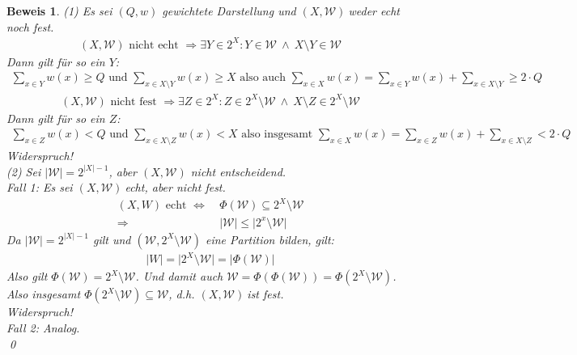 \documentclass[ngerman]{scrartcl}
\theoremstyle{custom}
\newtheorem*{bw}{Beweis}
\newcommand{\0}{\mathbf{0}}
\newcommand{\1}{\mathbf{L}}
\newcommand{\sg}{$(X,\mathcal{W})~$}
\newcommand{\W}{\mathcal{W}}
\begin{document}
\begin{bw}
(1) Es sei $(Q,w)$ gewichtete Darstellung und \sg weder echt noch
fest.
\begin{align*}
(X,\W) \text{ nicht echt } \Rightarrow \exists Y \in 2^X: Y \in \W
~\wedge~ X \setminus Y \in \W
\end{align*}
Dann gilt f\"ur so ein $Y$:
\begin{align*}
\sum_{x \in Y} w(x) \geq Q \text{ und } \sum_{x \in X \setminus Y}
w(x) \geq X \text{ also auch } \sum_{x \in X} w(x) = \sum_{x \in
  Y} w(x) + \sum_{x \in X \setminus Y} \geq 2 \cdot Q
\end{align*}
\begin{align*}
(X,\W) \text{ nicht fest } \Rightarrow \exists Z \in 2^X: Z \in 2^X
\setminus \W ~\wedge~ X \setminus Z \in 2^X \setminus \W
\end{align*}
Dann gilt f\"ur so ein $Z$:
\begin{align*}
\sum_{x \in Z} w(x) < Q \text{ und } \sum_{x \in X \setminus Z}
w(x) < X \text{ also insgesamt } \sum_{x \in X} w(x) = \sum_{x \in
  Z} w(x) + \sum_{x \in X \setminus Z} < 2 \cdot Q
\end{align*}
Widerspruch!\\

(2)
Sei $\vert \W \vert = 2^{\vert X \vert -1}$, aber $(X,\W)$ nicht
entscheidend.\\
\emph{Fall 1:} Es sei \sg echt, aber nicht fest.
\begin{align*}
(X,W) \text{ echt } \Leftrightarrow&~ \Phi(\W) \subseteq 2^X \setminus
\W \\
\Rightarrow&~ \vert \W \vert \leq \vert 2^x \setminus \W \vert
\end{align*}
Da $\vert \W \vert = 2^{\vert X \vert -1}$ gilt und $(\W, 2^X \setminus \W)$
eine Partition bilden, gilt:
\begin{align*}
\vert W \vert = \vert 2^X \setminus \W \vert = \vert \Phi(\W) \vert
\end{align*}
Also gilt $\Phi(\W) = 2^X \setminus \W$. Und damit auch $\W =
\Phi(\Phi(\W)) = \Phi(2^X \setminus \W)$. Also insgesamt $\Phi(2^X
\setminus \W) \subseteq \W$, d.h. \sg ist fest.\\
Widerspruch!\\

\emph{Fall 2:} Analog.\\
\qed
\end{bw}
\end{document}
